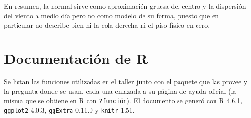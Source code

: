 \documentclass[oneside, openany, fontset=libertinus]{mitthesis}
\newif\ifbibimpresa
\newcommand{\imprimirbibliografia}{\printbibliography[heading=bibintoc]\global\bibimpresatrue}
\begin{document}
En resumen, la normal sirve como aproximación gruesa del centro y la
dispersión del viento a medio día pero no como modelo de su forma,
puesto que en particular no describe bien ni la cola derecha ni el piso
físico en cero.

\imprimirbibliografia
\appendix

\chapter{Documentación de R}\label{documentacion-r}

Se listan las funciones utilizadas en el taller junto con el paquete que
las provee y la pregunta donde se usan, cada una enlazada a su página de
ayuda oficial (la misma que se obtiene en R con \texttt{?función}). El
documento se generó con R 4.6.1, \texttt{ggplot2} 4.0.3,
\texttt{ggExtra} 0.11.0 y \texttt{knitr} 1.51.
\end{document}
